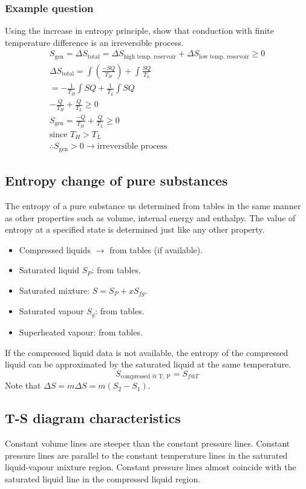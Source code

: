 \subsubsection{Example question}
Using the increase in entropy principle, show that conduction with finite temperature difference is an irreversible process.
\begin{gather}
  S_{\textrm{gen}} = \Delta S_{\textrm{total}} = \Delta S_{\textrm{high temp. reservoir}} + \Delta S_{\textrm{low temp. reservoir}} \geq 0\\
  \Delta S_{\textrm{total}} = \int \left( \frac{-SQ}{T_H} \right) + \int \frac{SQ}{T_L} \\
  = -\frac{1}{T_H} \int SQ + \frac{1}{T_L} \int SQ \\
  -\frac{Q}{T_H} + \frac{Q}{T_L} \geq 0 \\
  S_{\textrm{gen}} = \frac{-Q}{T_H} + \frac{Q}{T_L} \geq 0 \\
  \textrm{since } T_H > T_L \\
  \therefore S_{\textrm{gen}} > 0 \rightarrow \textrm{irreversible process}
\end{gather}
\subsection{Entropy change of pure substances}
The entropy of a pure substance us determined from tables in the same manner as other properties such as volume, internal energy and enthalpy. The value of entropy at a specified state is determined just like any other property.
\begin{itemize}[noitemsep]
  \item Compressed liquids \(\rightarrow\) from tables (if available).
  \item Saturated liquid \(S_P\): from tables.
  \item Saturated mixture: \(S=S_P + xS_{fg}\).
  \item Saturated vapour \(S_g\): from tables.
  \item Superheated vapour: from tables.
\end{itemize}
If the compressed liquid data is not available, the entropy of the compressed liquid can be approximated by the saturated liquid at the same temperature.
\begin{equation}
  S_{\textrm{compressed @ T, P}} = S_{f@T}
\end{equation}
Note that \( \Delta S = m \Delta S = m(S_2 - S_1)\).
\subsection{T-S diagram characteristics}
Constant volume lines are steeper than the constant pressure lines. Constant pressure lines are parallel to the constant temperature lines in the saturated liquid-vapour mixture region. Constant pressure lines almost coincide with the saturated liquid line in the compressed liquid region.
